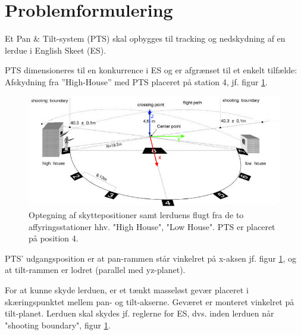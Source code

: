 \section{Problemformulering}
\label{sec:problemformulering}

Et Pan \& Tilt-system (PTS) skal opbygges til tracking og nedskydning af en lerdue i English Skeet (ES).

PTS dimensioneres til en konkurrence i ES og er afgrænset til et enkelt tilfælde:
Afskydning fra ”High-House” med PTS placeret på station 4, jf. figur \ref{fig:ES}.
\begin{figure}[th!]
\centering
\includegraphics[width=1\textwidth]{./graphics/skeet_diagram_cropped_axes}
\caption[Skitse af ES]{Optegning af skyttepositioner samt lerduens flugt fra de to affyringsstationer hhv. "High House", "Low House". PTS er placeret på position 4.}
\label{fig:ES}
\end{figure}	
PTS' udgangsposition er at pan-rammen står vinkelret på x-aksen jf. figur \ref{fig:ES},
og at tilt-rammen er lodret (parallel med yz-planet).



For at kunne skyde lerduen, er et tænkt masseløst gevær placeret i skæringspunktet mellem pan- og tilt-akserne. Geværet er monteret vinkelret på tilt-planet. 
Lerduen skal skydes jf. reglerne for ES, dvs. inden lerduen når "shooting boundary", figur \ref{fig:ES}.

